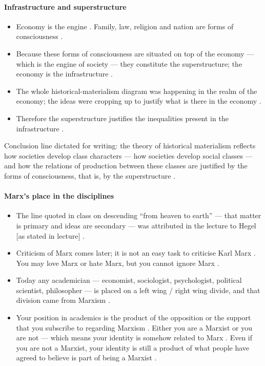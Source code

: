 \paragraph{Infrastructure and superstructure}
\begin{itemize}
    \item Economy is the engine . Family, law, religion and nation are forms of consciousness .
    \item Because these forms of consciousness are situated on top of the economy --- which is the engine of society --- they constitute the superstructure; the economy is the infrastructure .
    \item The whole historical-materialism diagram was happening in the realm of the economy; the ideas were cropping up to justify what is there in the economy .
    \item Therefore the superstructure justifies the inequalities present in the infrastructure .
\end{itemize}

\begin{CriticalPoint}
Conclusion line dictated for writing: the theory of historical materialism reflects how societies develop class characters --- how societies develop social classes --- and how the relations of production between these classes are justified by the forms of consciousness, that is, by the superstructure .
\end{CriticalPoint}

\paragraph{Marx's place in the disciplines}
\begin{itemize}
    \item The line quoted in class on descending ``from heaven to earth'' --- that matter is primary and ideas are secondary --- was attributed in the lecture to Hegel [as stated in lecture] .
    \item Criticism of Marx comes later; it is not an easy task to criticise Karl Marx . You may love Marx or hate Marx, but you cannot ignore Marx .
    \item Today any academician --- economist, sociologist, psychologist, political scientist, philosopher --- is placed on a left wing / right wing divide, and that division came from Marxism .
    \item Your position in academics is the product of the opposition or the support that you subscribe to regarding Marxism . Either you are a Marxist or you are not --- which means your identity is somehow related to Marx . Even if you are not a Marxist, your identity is still a product of what people have agreed to believe is part of being a Marxist .
\end{itemize}

